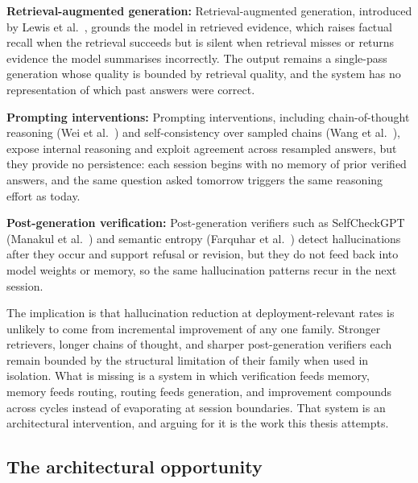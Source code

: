 \textbf{Retrieval-augmented generation:} Retrieval-augmented generation, introduced by Lewis et al.~\cite{NEURIPS2020_6b493230}, grounds the model in retrieved evidence, which raises factual recall when the retrieval succeeds but is silent when retrieval misses or returns evidence the model summarises incorrectly. The output remains a single-pass generation whose quality is bounded by retrieval quality, and the system has no representation of which past answers were correct.

\textbf{Prompting interventions:} Prompting interventions, including chain-of-thought reasoning (Wei et al.~\cite{wei2022chain}) and self-consistency over sampled chains (Wang et al.~\cite{wang2023selfconsistency}), expose internal reasoning and exploit agreement across resampled answers, but they provide no persistence: each session begins with no memory of prior verified answers, and the same question asked tomorrow triggers the same reasoning effort as today.

\textbf{Post-generation verification:} Post-generation verifiers such as SelfCheckGPT (Manakul et al.~\cite{manakul-etal-2023-selfcheckgpt}) and semantic entropy (Farquhar et al.~\cite{farquhar2024semantic}) detect hallucinations after they occur and support refusal or revision, but they do not feed back into model weights or memory, so the same hallucination patterns recur in the next session.

The implication is that hallucination reduction at deployment-relevant rates is unlikely to come from incremental improvement of any one family. Stronger retrievers, longer chains of thought, and sharper post-generation verifiers each remain bounded by the structural limitation of their family when used in isolation. What is missing is a system in which verification feeds memory, memory feeds routing, routing feeds generation, and improvement compounds across cycles instead of evaporating at session boundaries. That system is an architectural intervention, and arguing for it is the work this thesis attempts.

\subsection{The architectural opportunity}
\label{sec:arch-opportunity}

